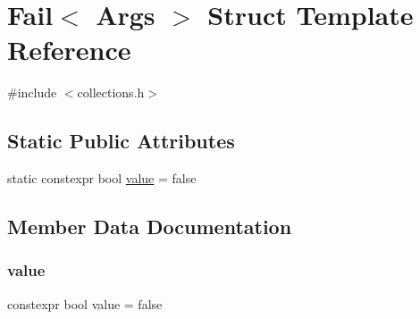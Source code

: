 \hypertarget{structstanfordcpplib_1_1collections_1_1Fail}{}\section{Fail$<$ Args $>$ Struct Template Reference}
\label{structstanfordcpplib_1_1collections_1_1Fail}


{\ttfamily \#include $<$collections.\+h$>$}

\subsection*{Static Public Attributes}
\begin{DoxyCompactItemize}
\item 
static constexpr bool \mbox{\hyperlink{structstanfordcpplib_1_1collections_1_1Fail_a5b4ee4ae6cba6bb75200ba7af1910873}{value}} = false
\end{DoxyCompactItemize}


\subsection{Member Data Documentation}
\mbox{\label{structstanfordcpplib_1_1collections_1_1Fail_a5b4ee4ae6cba6bb75200ba7af1910873}} 
\subsubsection{\texorpdfstring{value}{value}}
{\footnotesize\ttfamily constexpr bool value = false\hspace{0.3cm}{\ttfamily [static]}}

